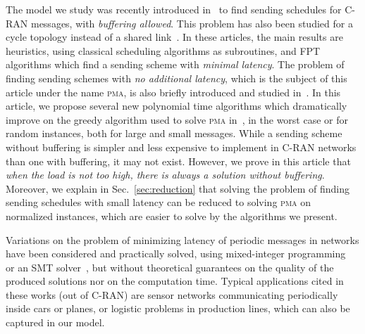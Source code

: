 \documentclass[a4paper,UKenglish,cleveref, autoref, thm-restate]{lipics-v2019}
\newcommand\pma{\textsc{pma}\xspace}
\begin{document}
The model we study was recently introduced in~\cite{barth2018deterministic,bartharxiv2018deterministic} to find sending schedules for C-RAN messages, with \emph{buffering allowed}. This problem has also been studied for a cycle topology instead of a shared link~\cite{Guir1905:Deterministic}. In these articles, the main results are heuristics, using classical scheduling algorithms as subroutines, and FPT algorithms which find a sending scheme with \emph{minimal latency}. The problem of finding sending schemes with \emph{no additional latency}, which is the subject of this article under the name \pma, is also briefly introduced and studied in~\cite{bartharxiv2018deterministic}.
In this article, we propose several new polynomial time algorithms which dramatically improve on the greedy algorithm used to solve \pma in~\cite{bartharxiv2018deterministic}, in the worst case or for random instances, both for large and small messages. 
While a sending scheme without buffering is simpler and less expensive to implement in C-RAN networks than one with buffering, it may not exist. However, we prove in this article that \emph{when the load is not too high, there is always a solution without buffering}. Moreover, we explain in Sec.~\ref{sec:reduction} that solving the problem of finding sending schedules with small latency can be reduced to solving \pma on normalized instances,
which are easier to solve by the algorithms we present.

 Variations on the problem of minimizing latency of periodic messages in networks have been considered and practically solved, using mixed-integer programming~\cite{nayak2017incremental,steiner2018traffic} or an SMT solver~\cite{dos2019tsnsched}, but without theoretical guarantees on the quality of the produced solutions nor on the computation time. Typical applications cited in these works (out of C-RAN) are sensor networks communicating periodically inside cars or planes, or logistic problems in production lines, which can also be captured in our model.
\end{document}
